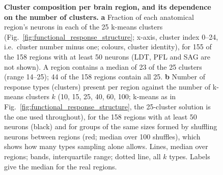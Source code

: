 \FloatBarrier

\FloatBarrier


\begin{figure}
\begin{fullwidth}
\caption{\textbf{Cluster composition per brain region, and its dependence on the number of clusters.}
\textbf{a} Fraction of each anatomical region's neurons in each of the 25 k-means clusters (Fig.~\ref{fig:functional_response_structure}; x-axis, cluster index 0--24, i.e.\ cluster number minus one; colours, cluster identity), for 155 of the 158 regions with at least 50 neurons (LDT, PFL and SAG are not shown). A region contains a median of 23 of the 25 clusters (range 14--25); 44 of the 158 regions contain all 25.
\textbf{b} Number of response types (clusters) present per region against the number of k-means clusters $k$ (10, 15, 25, 40, 60, 100; k-means as in Fig.~\ref{fig:functional_response_structure}, the 25-cluster solution is the one used throughout), for the 158 regions with at least 50 neurons (black) and for groups of the same sizes formed by shuffling neurons between regions (red; median over 100 shuffles), which shows how many types sampling alone allows. Lines, median over regions; bands, interquartile range; dotted line, all $k$ types. Labels give the median for the real regions.
\label{fig:regional_cluster_composition}
}

\end{fullwidth}
\end{figure}

